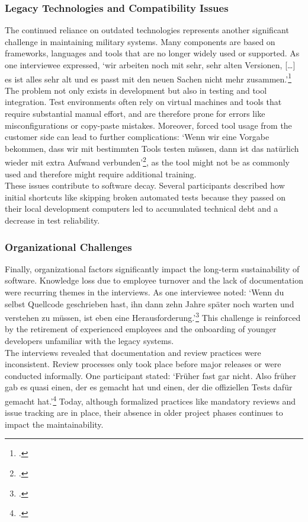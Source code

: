 \subsubsection{Legacy Technologies and Compatibility Issues}
The continued reliance on outdated technologies represents another significant challenge in maintaining military systems. Many components are based on frameworks, languages and tools that are no longer widely used or supported.
As one interviewee expressed, `wir arbeiten noch mit sehr, sehr alten Versionen, [\ldots] es ist alles sehr alt und es passt mit den neuen Sachen nicht mehr zusammen.'\footcite{Interview12025}\\

The problem not only exists in development but also in testing and tool integration. Test environments often rely on virtual machines and tools that require substantial manual effort, and are therefore prone for errors like misconfigurations or copy-paste mistakes.
Moreover, forced tool usage from the customer side can lead to further complications: `Wenn wir eine Vorgabe bekommen, dass wir mit bestimmten Tools testen müssen, dann ist das natürlich wieder mit extra Aufwand verbunden'\footcite{Interview32025}, as the tool might not be as commonly used and therefore might require additional training.\\

These issues contribute to software decay. Several participants described how initial shortcuts like skipping broken automated tests because they passed on their local development computers led to accumulated technical debt and a decrease in test reliability.\\

\subsubsection{Organizational Challenges}
Finally, organizational factors significantly impact the long-term sustainability of software. Knowledge loss due to employee turnover and the lack of documentation were recurring themes in the interviews.
As one interviewee noted: `Wenn du selbst Quellcode geschrieben hast, ihn dann zehn Jahre später noch warten und verstehen zu müssen, ist eben eine Herausforderung.'\footcite{Interview22025} This challenge is reinforced by the retirement of experienced employees and the onboarding of younger developers
unfamiliar with the legacy systems.\\

The interviews revealed that documentation and review practices were inconsistent. Review processes only took place before major releases or were conducted informally. One participant stated:
`Früher fast gar nicht. Also früher gab es quasi einen, der es gemacht hat und einen, der die offiziellen Tests dafür gemacht hat.'\footcite{Interview12025} Today, although formalized practices like mandatory reviews and issue tracking are in place, their absence in older project 
phases continues to impact the maintainability. 

